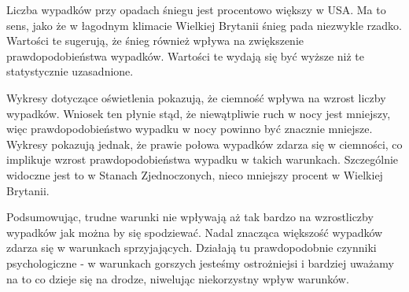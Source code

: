 Liczba wypadków przy opadach śniegu jest procentowo większy w USA. Ma to
sens, jako że w łagodnym klimacie Wielkiej Brytanii śnieg pada niezwykle
rzadko. Wartości te sugerują, że śnieg również wpływa na zwiększenie
prawdopodobieństwa wypadków. Wartości te wydają się być wyższe niż te
statystycznie uzasadnione.

Wykresy dotyczące oświetlenia pokazują, że ciemność wpływa na wzrost
liczby wypadków. Wniosek ten płynie stąd, że niewątpliwie ruch w nocy
jest mniejszy, więc prawdopodobieństwo wypadku w nocy powinno być
znacznie mniejsze. Wykresy pokazują jednak, że prawie połowa wypadków
zdarza się w ciemności, co implikuje wzrost prawdopodobieństwa wypadku w
takich warunkach. Szczególnie widoczne jest to w Stanach Zjednoczonych,
nieco mniejszy procent w Wielkiej Brytanii.

Podsumowując, trudne warunki nie wpływają aż tak bardzo na wzrostliczby
wypadków jak można by się spodziewać. Nadal znacząca większość wypadków
zdarza się w warunkach sprzyjających. Działają tu prawdopodobnie
czynniki psychologiczne - w warunkach gorszych jesteśmy ostrożniejsi i
bardziej uważamy na to co dzieje się na drodze, niwelując niekorzystny
wpływ warunków.
